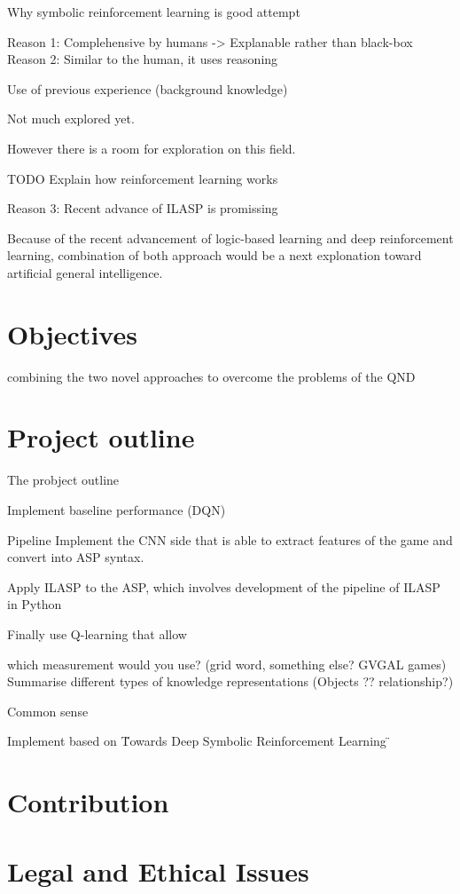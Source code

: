 \documentclass[12pt,twoside]{report}
\begin{document}
Why symbolic reinforcement learning is good attempt


Reason 1: Complehensive by humans -> Explanable rather than black-box
Reason 2: Similar to the human, it uses reasoning

Use of previous experience (background knowledge)

Not much explored yet.

However there is a room for exploration on this field.

TODO Explain how reinforcement learning works

Reason 3: Recent advance of ILASP is promissing

Because of the recent advancement of logic-based learning and deep reinforcement learning, combination of both approach would be a next explonation toward artificial general intelligence.


\section{Objectives}

combining the two novel approaches to overcome the problems of the QND

\section{Project outline}

The probject outline

Implement baseline performance (DQN)


Pipeline
Implement the CNN side that is able to extract features of the game and convert into ASP syntax.


Apply ILASP to the ASP, which involves development of the pipeline of ILASP in Python

Finally use Q-learning that allow



which measurement would you use? (grid word, something else? GVGAL games)
Summarise different types of knowledge representations (Objects ?? relationship?)

Common sense

Implement based on \"Towards Deep Symbolic Reinforcement Learning \"

\section{Contribution}


\section{Legal and Ethical Issues}
\end{document}
